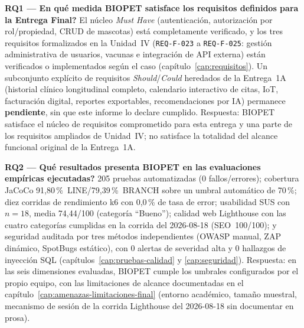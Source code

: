 \textbf{RQ1 --- \textquestiondown En qu\'e medida BIOPET satisface los
requisitos definidos para la Entrega Final?} El n\'ucleo \emph{Must Have}
(autenticaci\'on, autorizaci\'on por rol/propiedad, CRUD de mascotas) est\'a
completamente verificado, y los tres requisitos formalizados en la
Unidad~IV (\texttt{REQ-F-023} a \texttt{REQ-F-025}: gesti\'on
administrativa de usuarios, vacunas e integraci\'on de API externa) est\'an
verificados o implementados seg\'un el caso (cap\'itulo~\ref{cap:requisitos}). Un
subconjunto expl\'icito de requisitos \emph{Should}/\emph{Could} heredados
de la Entrega~1A (historial cl\'inico longitudinal completo, calendario
interactivo de citas, IoT, facturaci\'on digital, reportes exportables,
recomendaciones por IA) permanece \textbf{pendiente}, sin que este informe
lo declare cumplido. Respuesta: BIOPET satisface el n\'ucleo de requisitos
comprometido para esta entrega y una parte de los requisitos ampliados de
Unidad~IV; no satisface la totalidad del alcance funcional original de la
Entrega~1A.

\textbf{RQ2 --- \textquestiondown Qu\'e resultados presenta BIOPET en las
evaluaciones emp\'iricas ejecutadas?} 205 pruebas automatizadas (0
fallos/errores); cobertura JaCoCo 91{,}80\,\%~LINE/79{,}39\,\%~BRANCH sobre
un umbral autom\'atico de 70\,\%; diez corridas de rendimiento k6 con
0{,}0\,\% de tasa de error; usabilidad SUS con $n=18$, media 74{,}44/100
(categor\'ia ``Bueno''); calidad web Lighthouse con las cuatro categor\'ias
cumplidas en la corrida del 2026-08-18 (SEO~100/100); y seguridad auditada
por tres m\'etodos independientes (OWASP manual, ZAP din\'amico, SpotBugs
est\'atico), con 0 alertas de severidad alta y 0 hallazgos de inyecci\'on
SQL (cap\'itulos~\ref{cap:pruebas-calidad} y \ref{cap:seguridad}). Respuesta:
en las seis dimensiones evaluadas, BIOPET cumple los umbrales configurados
por el propio equipo, con las limitaciones de alcance documentadas en el
cap\'itulo~\ref{cap:amenazas-limitaciones-final} (entorno acad\'emico,
tama\~no muestral, mecanismo de sesi\'on de la corrida Lighthouse del
2026-08-18 sin documentar en prosa).


